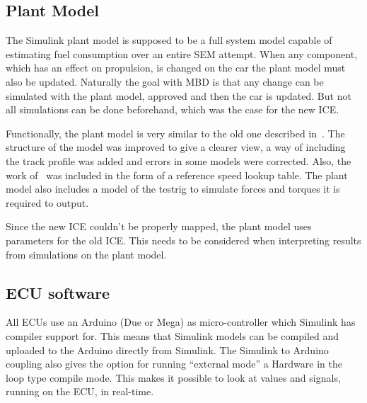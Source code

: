\subsection{Plant Model}
The Simulink plant model is supposed to be a full system model capable of
estimating fuel consumption over an entire SEM attempt. When any component,
which has an effect on propulsion, is changed on the car the plant model must
also be updated. Naturally the goal with MBD is that any change can be simulated
with the plant model, approved and then the car is updated. But not all
simulations can be done beforehand, which was the case for the new ICE\@. 

Functionally, the plant model is very similar to the old one described
in~\cite{elba2015}. The structure of the model was improved to give a clearer
view, a way of including the track profile was added and errors in some models
were corrected. Also, the work of~\citep{liu2016} was included in the form of a
reference speed lookup table. The plant model also includes a model of the
testrig to simulate forces and torques it is required to output.

Since the new ICE couldn't be properly mapped, the plant model uses parameters
for the old ICE\@. This needs to be considered when interpreting results from
simulations on the plant model.

\subsection{ECU software}
All ECUs use an Arduino (Due or Mega) as micro-controller which Simulink has
compiler support for. This means that Simulink models can be compiled and
uploaded to the Arduino directly from Simulink. The Simulink to Arduino coupling also
gives the option for running ``external mode'' a Hardware in the loop type compile mode.
This makes it possible to look at values and signals, running on the ECU, in
real-time.

